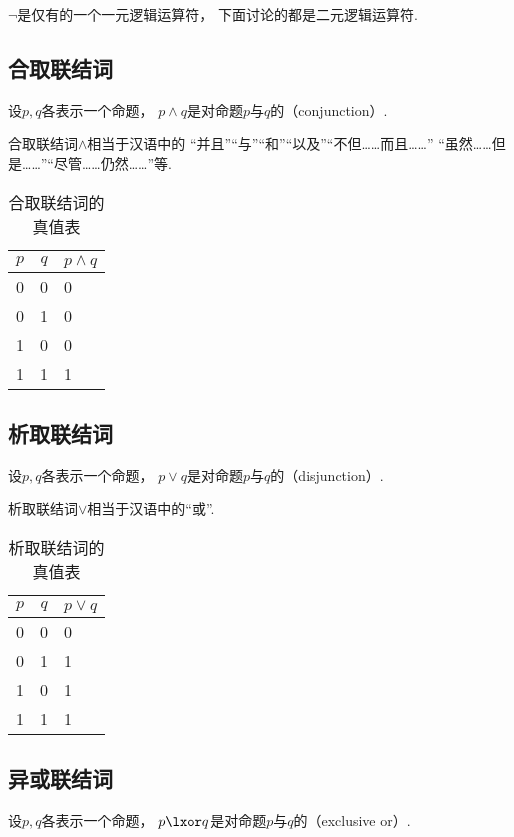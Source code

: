\(\neg\)是仅有的一个一元逻辑运算符，
下面讨论的都是二元逻辑运算符.

\subsection{合取联结词}
设\(p,q\)各表示一个命题，
\(p \land q\)是对命题\(p\)与\(q\)的（conjunction）.

合取联结词\(\land\)相当于汉语中的
“并且”“与”“和”“以及”“不但……而且……”
“虽然……但是……”“尽管……仍然……”等.

\begin{table}[ht]
	\centering
	\begin{tabular}{|*{2}{c|}p{2cm}|}
		\hline
		\(p\) & \(q\) & \(p \land q\) \\
		\hline
		0 & 0 & 0 \\
		0 & 1 & 0 \\
		1 & 0 & 0 \\
		1 & 1 & 1 \\
		\hline
	\end{tabular}
	\caption{合取联结词的真值表}
\end{table}

\subsection{析取联结词}
设\(p,q\)各表示一个命题，
\(p \lor q\)是对命题\(p\)与\(q\)的（disjunction）.

析取联结词\(\lor\)相当于汉语中的“或”.

\begin{table}[ht]
	\centering
	\begin{tabular}{|*{2}{c|}p{2cm}|}
		\hline
		\(p\) & \(q\) & \(p \lor q\) \\
		\hline
		0 & 0 & 0 \\
		0 & 1 & 1 \\
		1 & 0 & 1 \\
		1 & 1 & 1 \\
		\hline
	\end{tabular}
	\caption{析取联结词的真值表}
\end{table}

\subsection{异或联结词}
设\(p,q\)各表示一个命题，
\(p \lxor q\)是对命题\(p\)与\(q\)的（exclusive or）.

